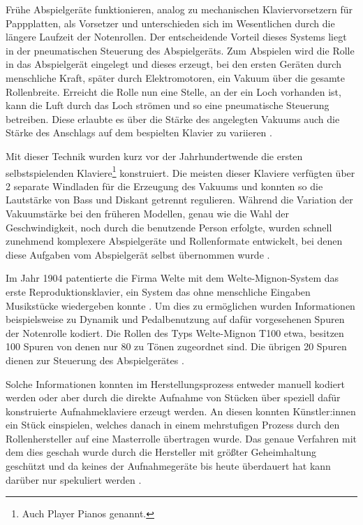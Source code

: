 Frühe Abspielgeräte funktionieren, analog zu mechanischen Klaviervorsetzern für Pappplatten, als Vorsetzer und unterschieden sich im Wesentlichen durch die längere Laufzeit der Notenrollen.
Der entscheidende Vorteil dieses Systems liegt in der pneumatischen Steuerung des Abspielgeräts.
Zum Abspielen wird die Rolle in das Abspielgerät eingelegt und dieses erzeugt, bei den ersten Geräten durch menschliche Kraft, später durch Elektromotoren, ein Vakuum über die gesamte Rollenbreite.
Erreicht die Rolle nun eine Stelle, an der ein Loch vorhanden ist, kann die Luft durch das Loch strömen und so eine pneumatische Steuerung betreiben.
Diese erlaubte es über die Stärke des angelegten Vakuums auch die Stärke des Anschlags auf dem bespielten Klavier zu variieren \parencite[III.5.d. Selbstspielende Klaviere]{mgg_mechanische}.

Mit dieser Technik wurden kurz vor der Jahrhundertwende die ersten selbstspielenden Klaviere\footnote{Auch Player Pianos genannt.} konstruiert.
Die meisten dieser Klaviere verfügten über 2 separate Windladen für die Erzeugung des Vakuums und konnten so die Lautstärke von Bass und Diskant getrennt regulieren.
Während die Variation der Vakuumstärke bei den früheren Modellen, genau wie die Wahl der Geschwindigkeit, noch durch die benutzende Person erfolgte, wurden schnell zunehmend komplexere Abspielgeräte und Rollenformate entwickelt, bei denen diese Aufgaben vom Abspielgerät selbst übernommen wurde \parencite[III.5.d. Selbstspielende Klaviere]{mgg_mechanische}.

Im Jahr 1904 patentierte die Firma Welte mit dem Welte-Mignon-System das erste Reproduktionsklavier, ein System das ohne menschliche Eingaben Musikstücke wiedergeben konnte \parencite[III.5.d. Selbstspielende Klaviere]{mgg_mechanische}.
Um dies zu ermöglichen wurden Informationen beispielsweise zu Dynamik und Pedalbenutzung auf dafür vorgesehenen Spuren der Notenrolle kodiert.
Die Rollen des Typs Welte-Mignon T100 etwa, besitzen 100 Spuren von denen nur 80 zu Tönen zugeordnet sind.
Die übrigen 20 Spuren dienen zur Steuerung des Abspielgerätes \parencite[]{mxp_2002522}.

Solche Informationen konnten im Herstellungsprozess entweder manuell kodiert werden oder aber durch die direkte Aufnahme von Stücken über speziell dafür konstruierte Aufnahmeklaviere erzeugt werden.
An diesen konnten Künstler:innen ein Stück einspielen, welches danach in einem mehrstufigen Prozess durch den Rollenhersteller auf eine Masterrolle übertragen wurde.
Das genaue Verfahren mit dem dies geschah wurde durch die Hersteller mit größter Geheimhaltung geschützt und da keines der Aufnahmegeräte bis heute überdauert hat kann darüber nur spekuliert werden \parencite[]{zoltan_1994}.


